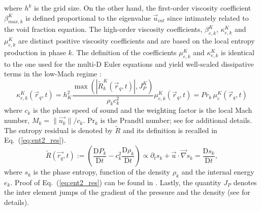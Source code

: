 \documentclass{anstrans}
\newcommand{\grad}{\vec{\nabla}}
\renewcommand{\Pr}{\textrm{Pr}}
\newcommand{\resi}{R}
\newcommand{\resinew}{\widetilde{\resi}}
\newcommand{\matder}[1]{\frac{\textrm{D} #1}{\textrm{D} t}}
\newcommand{\eqt}[1]{Eq.~(\ref{#1})}                     %
\begin{document}
%
where $h^k$ is the grid size. On the other hand, the first-order viscosity coefficient $\beta^K_{max,k}$ is defined proportional to the eigenvalue $\vec{u}_{int}$ since intimately related to the void fraction equation. The high-order viscosity coefficients, $\beta^K_{e,k}$, $\kappa^K_{e,k}$ and $\mu^K_{e,k}$ are distinct positive viscosity coefficients and are based on the local entropy production in phase $k$. The definition of the coefficients $\mu^K_{e,k}$ and $\kappa^K_{e,k}$ is identical to the one used for the multi-D Euler equations \cite{marco_inl_report} and yield well-scaled dissipative terms in the low-Mach regime \cite{LowMach1, LowMach2, LowMach3}:
%
\begin{subequations}
\label{eq:ent_visc_coeff2}
\begin{equation}
\kappa^K_{e,k}(\vec{r}_q,t) =  h_K^2 \frac{\max \left( | \resinew_k^K(\vec{r}_q,t) |, J_P^K \right)}{\rho_k c_k^2}  
\end{equation}
\begin{equation}
\mu^K_{e,k}(\vec{r}_q,t) = Pr_k \, \mu^K_e(\vec{r}_q,t)
\end{equation}
\end{subequations}
%
where $c_k$ is the phase speed of sound and the weighting factor is the local Mach number, $M_k=\|\vec{u_k}\|/c_k$. $\Pr_k$ is the Prandtl number; see \cite{jlg1} for additional details. The entropy residual is denoted by $\resinew$ and its definition is recalled in \eqt{eq:ent2_res}.  
%
\begin{equation}
\label{eq:ent2_res}
\resinew(\vec{r_q},t) := \left( \matder{P_k} - c^2_k \matder{\rho_k} \right) \propto \partial_t s_k + \vec{u} \cdot \grad s_k = \matder{s_k},
\end{equation} 
%
where $s_k$ is the phase entropy, function of the density $\rho_k$ and the internal energy $e_k$. Proof of \eqt{eq:ent2_res} can be found in \cite{marco_inl_report}. Lastly, the quantity $J_P$ denotes the inter element jumps of the gradient of the pressure and the density (see \cite{marco_inl_report} for details).
\end{document}
